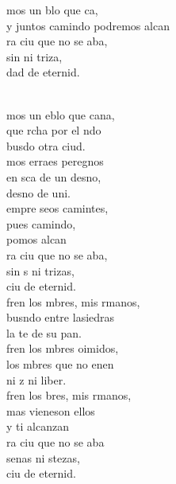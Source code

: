 \documentclass[12pt]{article}
\begin{document}
\begin{multicols*}{2}
\begin{cancion}%
	\begin{chorus}%
	mos un blo que ca,\\
	y juntos camindo podremos alcan\\
	ra ciu que no se aba,\\
	sin  ni triza,\\
	dad de eternid.\\
	\end{chorus}%
	\jump\\
	mos un eblo que cana,\\
	que rcha por el ndo\\
	busdo otra ciud.\\
	mos erraes peregnos\\
	en sca de un desno,\\
	desno de uni.\\
	empre seos camintes,\\
	pues  camindo,\\
	pomos alcan\\
	ra ciu que no se aba,\\
	sin s ni trizas,\\
	ciu de eternid.\\
\jump
	fren los mbres, mis rmanos,\\
	busndo entre lasiedras\\
	la te de su pan.\\
	fren los mbres oimidos,\\
	los mbres que no enen\\
	ni z ni liber.\\
	fren los bres, mis rmanos,\\
	mas vieneson ellos\\
	y ti alcanzan\\
	ra ciu que no se aba\\
	senas ni stezas,\\
	ciu de eternid.\\
\end{cancion}%


\end{multicols*}
\end{document}
